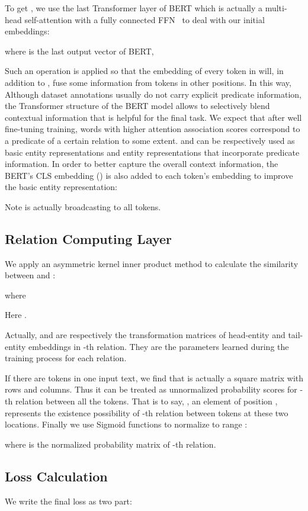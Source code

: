 \documentclass[11pt,a4paper]{article}
\begin{document}
To get , we use the last Transformer layer of BERT which is actually a multi-head self-attention with a fully connected FFN~\cite{vaswani2017attention} to deal with our initial embeddings:


where  is the last output vector of BERT, 


Such an operation is applied so that the embedding of every token in  will, in addition to , fuse some information from tokens in other positions. In this way, Although dataset annotations usually do not carry explicit predicate information, the Transformer structure of the BERT model allows   to selectively blend contextual information that is helpful for the final task. We expect that after well fine-tuning training, words with higher attention association scores correspond to a predicate of a certain relation to some extent.  and  can be respectively used as basic entity representations and entity representations that incorporate predicate information. In order to better capture the overall context information, the BERT's CLS embedding () is also added to each token's embedding to improve the basic entity representation:

Note  is actually broadcasting to all tokens.
\subsection{Relation Computing Layer}
We apply an asymmetric kernel inner product method to calculate the similarity between  and :

    where  

Here .

Actually,  and  are respectively the transformation matrices of head-entity and tail-entity embeddings in -th relation. They are the parameters learned during the training process for each relation. 

If there are  tokens in one input text, we find that  is actually a square matrix with  rows and columns. Thus it can be treated as unnormalized probability scores for -th relation between all the tokens. That is to say, , an element of position , represents the existence possibility of -th relation between tokens at these two locations. Finally we use Sigmoid functions to normalize  to range :


where  is the normalized probability matrix of -th relation. 

\subsection{Loss Calculation}
\label{loss}
\iffalse We write the final loss  as two part:
\end{document}

